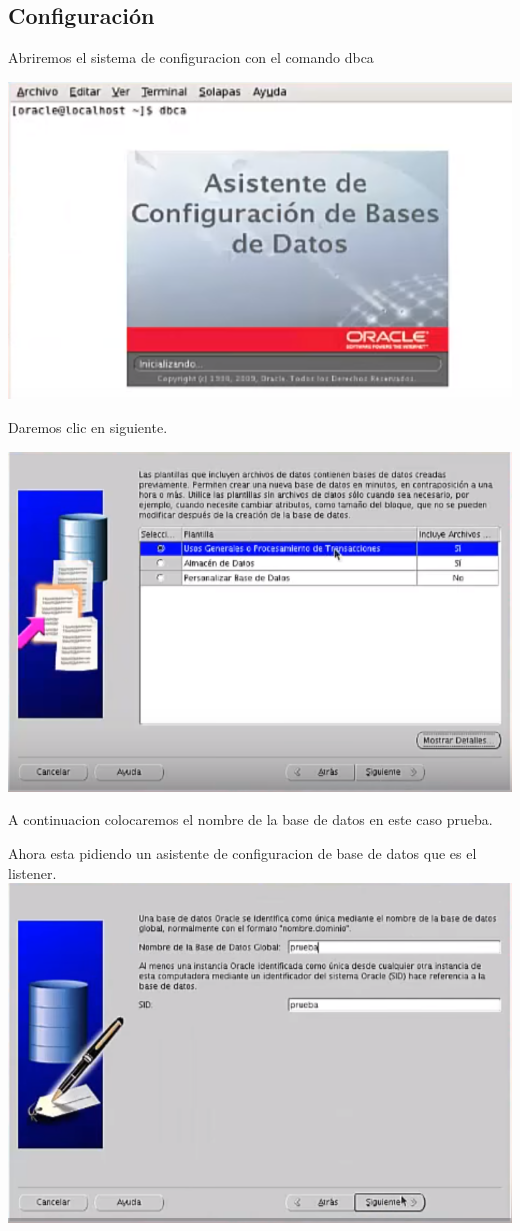 \documentclass[12pt,letterpaper]{article}
\begin{document}
\subsection{Configuraci\'on}
Abriremos el sistema de configuracion con el comando dbca \\
\begin{center}
\includegraphics[width=15cm]{oraclelinux/30.png} 
\end{center}
Daremos clic en siguiente. \\
\begin{center}
\includegraphics[width=15cm]{oraclelinux/31.png}
\end{center}
A continuacion colocaremos el nombre de la base de datos en este caso  prueba. \\
\begin{center}
Ahora esta pidiendo un asistente de configuracion de base de datos que es el listener.\\
\includegraphics[width=15cm]{oraclelinux/32.png}
\end{center}
\end{document}
